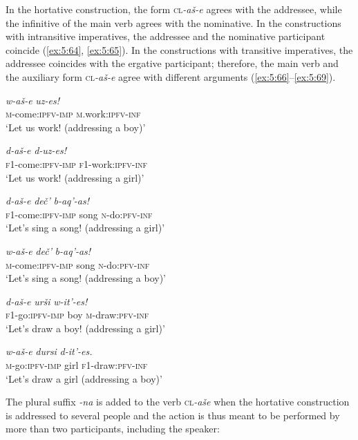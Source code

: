 ﻿\documentclass[output=paper]{langsci/langscibook}
\begin{document}
In the hortative construction, the form \textsc{cl}\emph{-aš-e} agrees with the
addressee, while the infinitive of the main verb agrees with the
nominative. In the constructions with intransitive imperatives, the
addressee and the nominative participant coincide (\ref{ex:5:64}, \ref{ex:5:65}). In the
constructions with transitive imperatives, the addressee coincides with
the ergative participant; therefore, the main verb and the auxiliary
form \textsc{cl}\emph{-aš-e} agree with different arguments (\ref{ex:5:66}–\ref{ex:5:69}).

\ea \label{ex:5:64} %
\gll \emph{w-aš-e} \emph{uz-es!}\\
\textsc{m}-come:\textsc{ipfv}-\textsc{imp} \textsc{m}.work:\textsc{ipfv}-\textsc{inf}\\
\glt `Let us work! (addressing a boy)'

\ex \label{ex:5:65} %
\gll \emph{d-aš-e} \emph{d-uz-es!}\\
\textsc{f1}-come:\textsc{ipfv}-\textsc{imp} \textsc{f1}-work:\textsc{ipfv}-\textsc{inf}\\
\glt `Let us work! (addressing a girl)'

\ex \label{ex:5:66} %
\gll \emph{d-aš-e} \emph{deč'} \emph{b-aq'-as!}\\
 \textsc{f1}-come:\textsc{ipfv}-\textsc{imp} song \textsc{n}-do:\textsc{pfv}-\textsc{inf}\\
\glt `Let's sing a song! (addressing a girl)'

\ex %
\gll \emph{w-aš-e} \emph{deč'} \emph{b-aq'-as!}\\
 \textsc{m}-come:\textsc{ipfv}-\textsc{imp} song \textsc{n}-do:\textsc{pfv}-\textsc{inf}\\
\glt `Let's sing a song! (addressing a boy)'

\ex %
\gll \emph{d-aš-e} \emph{urši} \emph{w-it'-es!}\\
 \textsc{f1}-go:\textsc{ipfv}-\textsc{imp} boy \textsc{m}-draw:\textsc{pfv}-\textsc{inf}\\
\glt `Let's draw a boy! (addressing a girl)'

\ex \label{ex:5:69} %
\gll \emph{w-aš-e} \emph{dursi} \emph{d-it'-es.}\\
 \textsc{m}-go:\textsc{ipfv}-\textsc{imp} girl \textsc{f1}-draw:\textsc{pfv}-\textsc{inf}\\
\glt `Let's draw a girl (addressing a boy)'
\z

The plural suffix \emph{-na} is added to the verb \textsc{cl}\emph{-aše} when the
hortative construction is addressed to several people and the action is
thus meant to be performed by more than two participants, including the
speaker:
\end{document}
